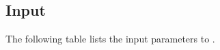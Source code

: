 \documentclass[10pt]{article}
\begin{document}
\section{}  \label{ss:hypre-solve}

\subsection{Input}

The following table lists the input parameters to .
\end{document}
